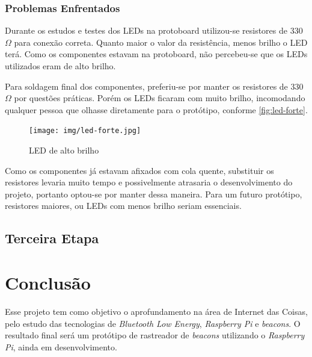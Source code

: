 \documentclass[
		12pt,				%
		openright,			%
		oneside,			%
		a4paper,			%
		chapter=TITLE,		%
		english,			%
		brazil				%
	]{abntex2}
\begin{document}
\subsection{Problemas Enfrentados}\label{sec:problemas-enfrentados}

Durante os estudos e testes dos LEDs na protoboard utilizou-se resistores de 330$\Omega$ para conexão correta. Quanto maior o valor da resistência, menos brilho o LED terá. Como os componentes estavam na protoboard, não percebeu-se que os LEDs utilizados eram de alto brilho.

Para soldagem final dos componentes, preferiu-se por manter os resistores de 330$\Omega$ por questões práticas. Porém os LEDs ficaram com muito brilho, incomodando qualquer pessoa que olhasse diretamente para o protótipo, conforme \autoref{fig:led-forte}.

\begin{figure}[htb]
	\caption{\label{fig:led-forte}LED de alto brilho}
	\begin{center}
		\texttt{[image: img/led-forte.jpg]}
	\end{center}
\end{figure}

Como os componentes já estavam afixados com cola quente, substituir os resistores levaria muito tempo e possivelmente atrasaria o desenvolvimento do projeto, portanto optou-se por manter dessa maneira. Para um futuro protótipo, resistores maiores, ou LEDs com menos brilho seriam essenciais.

\section{Terceira Etapa}\label{sec:terceira-etapa}




\chapter{Conclusão}

Esse projeto tem como objetivo o aprofundamento na área de Internet das Coisas, pelo estudo das tecnologias de \textit{Bluetooth Low Energy}, \textit{Raspberry Pi} e \textit{beacons}. O resultado final será um protótipo de rastreador de \textit{beacons} utilizando o \textit{Raspberry Pi}, ainda em desenvolvimento.
\end{document}
